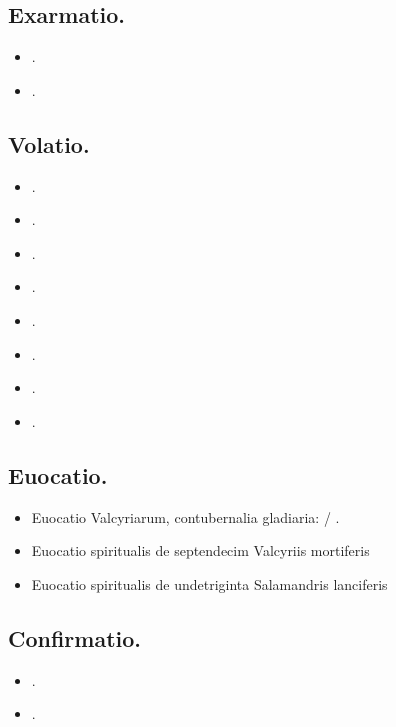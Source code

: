 \documentclass[12pt]{book}
\begin{document}
\subsection{Exarmatio.}\label{exarmatio}

\begin{itemize}
  \item {}.
  \item {}.
\end{itemize}

\subsection{Volatio.}\label{volatio}

\begin{itemize}
  \item {}.
  \item {}.
  \item {}.
  \item {}.
  \item {}.
  \item {}.
  \item {}.
  \item {}.
\end{itemize}

\subsection{Euocatio.}\label{evocatio}

\begin{itemize}
  \item Euocatio Valcyriarum, contubernalia gladiaria:  / .
  \item Euocatio spiritualis de septendecim Valcyriis mortiferis \textelp{}
  \item Euocatio spiritualis de undetriginta Salamandris lanciferis \textelp{}
\end{itemize}

\subsection{Confirmatio.}\label{confirmatio}
\begin{itemize}
  \item {}.
  \item {}.
\end{itemize}
\end{document}
